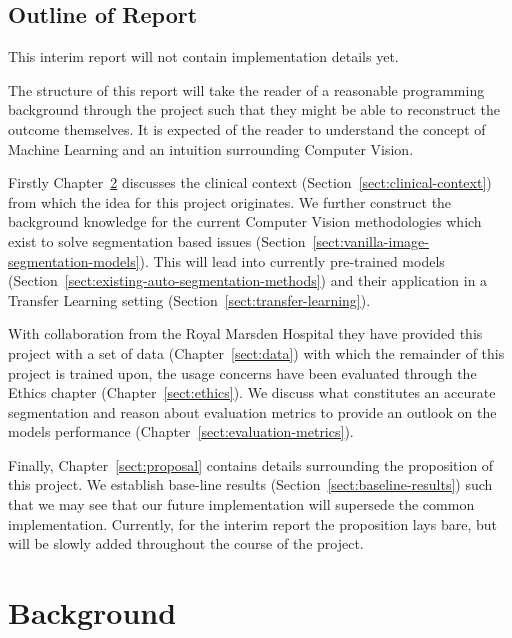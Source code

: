 \documentclass[11pt,twoside]{report}
\begin{document}
\section{Outline of Report}\label{sect:outline-of-report}

\begin{warning}
  This interim report will not contain implementation details yet.
\end{warning}

The structure of this report will take the reader of a reasonable programming background through the project such that they might be able to reconstruct the outcome themselves. It is expected of the reader to understand the concept of Machine Learning and an intuition surrounding Computer Vision.

Firstly Chapter~\ref{sect:background} discusses the clinical context (Section~\ref{sect:clinical-context}) from which the idea for this project originates. We further construct the background knowledge for the current Computer Vision methodologies which exist to solve segmentation based issues (Section~\ref{sect:vanilla-image-segmentation-models}). This will lead into currently pre-trained models (Section~\ref{sect:existing-auto-segmentation-methods}) and their application in a Transfer Learning setting (Section~\ref{sect:transfer-learning}).

With collaboration from the Royal Marsden Hospital they have provided this project with a set of data (Chapter~\ref{sect:data}) with which the remainder of this project is trained upon, the usage concerns have been evaluated through the Ethics chapter (Chapter~\ref{sect:ethics}). We discuss what constitutes an accurate segmentation and reason about evaluation metrics to provide an outlook on the models performance (Chapter~\ref{sect:evaluation-metrics}).

Finally, Chapter~\ref{sect:proposal} contains details surrounding the proposition of this project. We establish base-line results (Section~\ref{sect:baseline-results}) such that we may see that our future implementation will supersede the common implementation. Currently, for the interim report the proposition lays bare, but will be slowly added throughout the course of the project. 

\chapter{Background}\label{sect:background}
\end{document}
